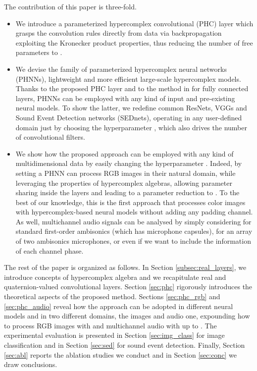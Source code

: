 \documentclass[lettersize,journal]{IEEEtran}
\begin{document}
The contribution of this paper is three-fold.
\begin{itemize}
    \item We introduce a parameterized hypercomplex convolutional (PHC) layer which grasps the convolution rules directly from data via backpropagation exploiting the Kronecker product properties, thus reducing the number of free parameters to .
    \item We devise the family of parameterized hypercomplex neural networks (PHNNs), lightweight and more efficient large-scale hypercomplex models. Thanks to the proposed PHC layer and to the method in \cite{Zhang2021PHM} for fully connected layers, PHNNs can be employed with any kind of input and pre-existing neural models. To show the latter, we redefine common ResNets, VGGs and Sound Event Detection networks (SEDnets), operating in any user-defined domain just by choosing the hyperparameter , which also drives the number of convolutional filters.
    \item We show how the proposed approach can be employed with any kind of multidimensional data by easily changing the hyperparameter . Indeed, by setting  a PHNN can process RGB images in their natural domain, while leveraging the properties of hypercomplex algebras, allowing parameter sharing inside the layers and leading to a parameter reduction to . To the best of our knowledge, this is the first approach that processes color images with hypercomplex-based neural models without adding any padding channel. As well, multichannel audio signals can be analysed by simply considering  for standard first-order ambisonics (which has  microphone capsules),  for an array of two ambisonics microphones, or even  if we want to include the information of each channel phase.

\end{itemize}

The rest of the paper is organized as follows. In Section \ref{subsec:real_layers}, we introduce concepts of hypercomplex algebra and we recapitulate real and quaternion-valued convolutional layers. Section \ref{sec:phc} rigorously introduces the theoretical aspects of the proposed method. Sections \ref{sec:phc_rgb} and \ref{sec:phc_audio} reveal how the approach can be adopted in different neural models and in two different domains, the images and audio one, expounding how to process RGB images with  and multichannel audio with  up to . The experimental evaluation is presented in Section \ref{sec:img_class} for image classification and in Section \ref{sec:sed} for sound event detection. Finally, Section \ref{sec:abl} reports the ablation studies we conduct and in Section \ref{sec:conc} we draw conclusions. 
\end{document}
